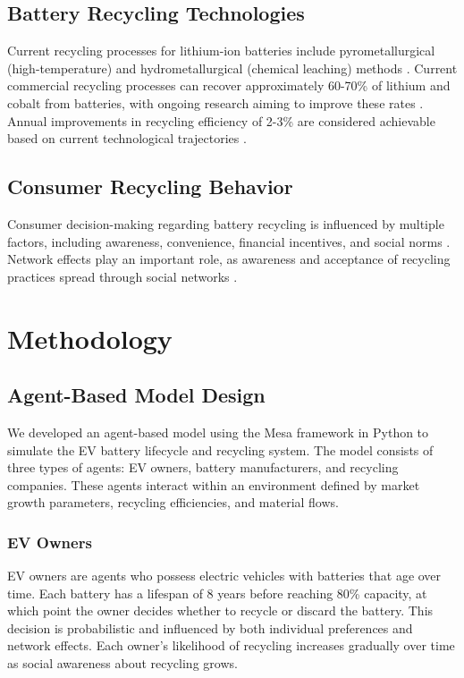\documentclass[10pt,a4paper,twocolumn]{article}
\begin{document}
\subsection{Battery Recycling Technologies}

Current recycling processes for lithium-ion batteries include pyrometallurgical (high-temperature) and hydrometallurgical (chemical leaching) methods \citep{zheng2018}. Current commercial recycling processes can recover approximately 60-70\% of lithium and cobalt from batteries, with ongoing research aiming to improve these rates \citep{dunn2021}. Annual improvements in recycling efficiency of 2-3\% are considered achievable based on current technological trajectories \citep{rmi2022}.

\subsection{Consumer Recycling Behavior}

Consumer decision-making regarding battery recycling is influenced by multiple factors, including awareness, convenience, financial incentives, and social norms \citep{sun2020}. Network effects play an important role, as awareness and acceptance of recycling practices spread through social networks \citep{axsen2013}.

\section{Methodology}
\label{sec:methodology}

\subsection{Agent-Based Model Design}

We developed an agent-based model using the Mesa framework in Python to simulate the EV battery lifecycle and recycling system. The model consists of three types of agents: EV owners, battery manufacturers, and recycling companies. These agents interact within an environment defined by market growth parameters, recycling efficiencies, and material flows.

\subsubsection{EV Owners}

EV owners are agents who possess electric vehicles with batteries that age over time. Each battery has a lifespan of 8 years before reaching 80\% capacity, at which point the owner decides whether to recycle or discard the battery. This decision is probabilistic and influenced by both individual preferences and network effects. Each owner's likelihood of recycling increases gradually over time as social awareness about recycling grows.
\end{document}

